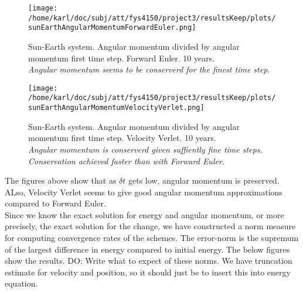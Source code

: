 \documentclass{article}
\begin{document}
\begin{minipage}{.49\textwidth} 
	\begin{figure}[H]
		\centering
		\texttt{[image: /home/karl/doc/subj/att/fys4150/project3/resultsKeep/plots/sunEarthAngularMomentumForwardEuler.png]}
		\caption{Sun-Earth system. Angular momentum divided by angular momentum first time step. Forward Euler. 10 years. \\ \textit{Angular momentum seems to be conserverd for the finest time step.}}
		\label{1}
	\end{figure}
\end{minipage}\hfill
\begin{minipage}{.49\textwidth} 
	\begin{figure}[H]
		\centering
		\texttt{[image: /home/karl/doc/subj/att/fys4150/project3/resultsKeep/plots/sunEarthAngularMomentumVelocityVerlet.png]}
		\caption{Sun-Earth system. Angular momentum divided by angular momentum first time step. Velocity Verlet. 10 years. \\ \textit{Angular momentum is conserverd given suffiently fine time steps. Conservation achieved faster than with Forward Euler.}}
		\label{1}
	\end{figure}
\end{minipage}\hfill
\vspace{2ex}

The figures above show that as $\delta t$ gets low, angular momentum is preserved. ALso, Velocity Verlet seems to give good angular momentum approximations compared to Forward Euler.\\

Since we know the exact solution for energy and angular momentum, or more precisely, the exact solution for the change, we have constructed a norm measure for computing convergence rates of the schemes. The error-norm is the supremum of the largest difference in energy compared to initial energy. The below figures show the results. DO: Write what to expect of these norms. We have truncation estimate for velocity and position, so it should just be to insert this into energy equation.
\end{document}
